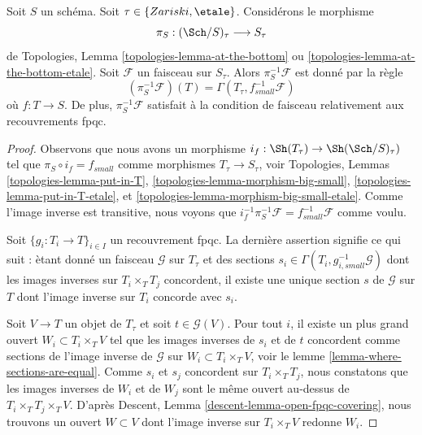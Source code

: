\begin{lemma}
\label{lemma-describe-pullback}
Soit $S$ un sch\'ema. Soit $\tau \in \{Zariski, \etale\}$. Consid\'erons le morphisme
$$
\pi_S : (\Sch/S)_\tau \longrightarrow S_\tau
$$
de Topologies, Lemma \ref{topologies-lemma-at-the-bottom} ou
\ref{topologies-lemma-at-the-bottom-etale}. Soit $\mathcal{F}$ un faisceau sur
$S_\tau$. Alors $\pi_S^{-1}\mathcal{F}$ est donn\'e par la r\`egle
$$
(\pi_S^{-1}\mathcal{F})(T) = \Gamma(T_\tau, f_{small}^{-1}\mathcal{F})
$$
o\`u $f : T \to S$. De plus, $\pi_S^{-1}\mathcal{F}$ satisfait \`a la
condition de faisceau relativement aux recouvrements fpqc.
\end{lemma}

\begin{proof}
Observons que nous avons un morphisme $i_f : \Sh(T_\tau) \to \Sh(\Sch/S)_\tau)$
tel que $\pi_S \circ i_f = f_{small}$ comme morphismes
$T_\tau \to S_\tau$, voir
Topologies, Lemmas \ref{topologies-lemma-put-in-T},
\ref{topologies-lemma-morphism-big-small},
\ref{topologies-lemma-put-in-T-etale}, et
\ref{topologies-lemma-morphism-big-small-etale}.
Comme l'image inverse est transitive, nous voyons que
$i_f^{-1} \pi_S^{-1}\mathcal{F} = f_{small}^{-1}\mathcal{F}$ comme voulu.

\medskip\noindent
Soit $\{g_i : T_i \to T\}_{i \in I}$ un recouvrement fpqc.
La derni\`ere assertion signifie ce qui suit : \`etant donn\'e un faisceau $\mathcal{G}$
sur $T_\tau$ et des sections
$s_i \in \Gamma(T_i, g_{i, small}^{-1}\mathcal{G})$ dont les images inverses
sur $T_i \times_T T_j$ concordent, il existe une unique section $s$ de $\mathcal{G}$
sur $T$ dont l'image inverse sur $T_i$ concorde avec $s_i$.

\medskip\noindent
Soit $V \to T$ un objet de $T_\tau$ et soit $t \in \mathcal{G}(V)$.
Pour tout $i$, il existe un plus grand ouvert $W_i \subset T_i \times_T V$
tel que les images inverses de $s_i$ et de $t$ concordent comme sections de l'image
inverse de $\mathcal{G}$ sur $W_i \subset T_i \times_T V$, voir le
lemme \ref{lemma-where-sections-are-equal}.
Comme $s_i$ et $s_j$ concordent sur $T_i \times_T T_j$, nous constatons
que les images inverses de $W_i$ et de $W_j$ sont le m\^eme ouvert au-dessus de
$T_i \times_T T_j \times_T V$. D'apr\`es
Descent, Lemma \ref{descent-lemma-open-fpqc-covering},
nous trouvons un ouvert $W \subset V$ dont l'image inverse sur $T_i \times_T V$
redonne $W_i$.


\end{proof}
